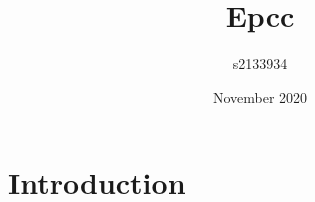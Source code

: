 \documentclass{article}
\title{Epcc}
\author{s2133934 }
\date{November 2020}
\begin{document}
\maketitle

\section{Introduction}
\end{document}
